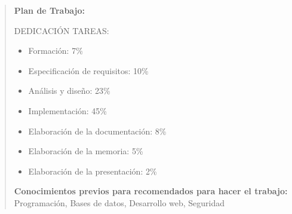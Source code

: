 \documentclass[11pt,a4paper]{article}
\begin{document}
\begin{quote}
\textbf{Plan de Trabajo:} 

DEDICACIÓN TAREAS:

\begin{itemize}
    \item Formación: 7\%
    \item Especificación de requisitos: 10\%
    \item Análisis y diseño: 23\%
    \item Implementación: 45\%
    \item Elaboración de la documentación: 8\%
    \item Elaboración de la memoria: 5\%
    \item Elaboración de la presentación: 2\%
\end{itemize}
\textbf{Conocimientos previos para  recomendados para hacer el trabajo:}	Programación, Bases de datos, Desarrollo web, Seguridad
\end{quote}

\normalsize
\end{document}
